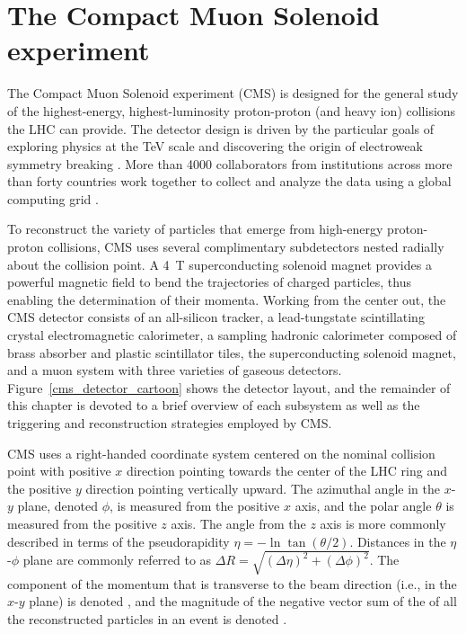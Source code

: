 \section{The Compact Muon Solenoid experiment}
\label{cms}
The Compact Muon Solenoid experiment (CMS) is designed for the general study of the highest-energy, highest-luminosity proton-proton (and heavy ion) collisions the LHC can provide. The detector design is driven by the particular goals of exploring physics at the \si{\TeV} scale and discovering the origin of electroweak symmetry breaking \cite{cms_tdr_v2}. More than 4000 collaborators from institutions across more than forty countries work together to collect and analyze the data using a global computing grid \cite{cms_collaboration}.

To reconstruct the variety of particles that emerge from high-energy proton-proton collisions, CMS uses several complimentary subdetectors nested radially about the collision point. A \SI{4}{\tesla} superconducting solenoid magnet provides a powerful magnetic field to bend the trajectories of charged particles, thus enabling the determination of their momenta. Working from the center out, the CMS detector consists of an all-silicon tracker, a lead-tungstate scintillating crystal electromagnetic calorimeter, a sampling hadronic calorimeter composed of brass absorber and plastic scintillator tiles, the superconducting solenoid magnet, and a muon system with three varieties of gaseous detectors. Figure~\ref{cms_detector_cartoon} shows the detector layout, and the remainder of this chapter is devoted to a brief overview of each subsystem as well as the triggering and reconstruction strategies employed by CMS.



CMS uses a right-handed coordinate system centered on the nominal collision point with positive $x$ direction pointing towards the center of the LHC ring and the positive $y$ direction pointing vertically upward. The azimuthal angle in the $x$-$y$ plane, denoted $\phi$, is measured from the positive $x$ axis, and the polar angle $\theta$ is measured from the positive $z$ axis. The angle from the $z$ axis is more commonly described in terms of the pseudorapidity $\eta=-\ln\tan(\theta/2)$. Distances in the $\eta$-$\phi$ plane are commonly referred to as $\Delta R = \sqrt{(\Delta \eta)^2 + (\Delta \phi)^2}$. The component of the momentum that is transverse to the beam direction (i.e., in the $x$-$y$ plane) is denoted \pt, and the magnitude of the negative vector sum of the \pt of all the reconstructed particles in an event is denoted \ptmiss \cite{cms_tdr_v1, cms_experiment}. 

